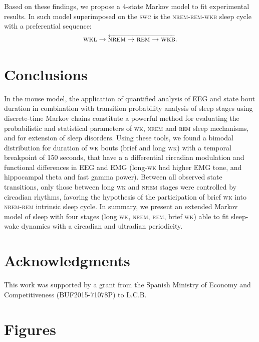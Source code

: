 \documentclass[10pt,letterpaper]{article}
\def\REM/{\textsc{rem}}
\def\NREM/{\textsc{nrem}}
\def\WK/{\textsc{wk}}
\def\WKL/{\textsc{wkl}}
\def\WKB/{\textsc{wkb}}
\def\SWC/{\textsc{swc}}
\begin{document}
 
Based on these findings, we propose a 4-state Markov model to fit  experimental results.  In such model superimposed on the \SWC/ is the \NREM/-\REM/-\WKB/ sleep cycle with a preferential sequence:
 \[ \WKL/ \rightarrow  \overleftarrow {  \NREM/\rightarrow  \REM/\rightarrow  \WKB/}   .\]


			
\section{Conclusions}
In the mouse model, the application of quantified analysis of EEG and state bout duration  in combination with transition probability analysis of sleep stages using discrete-time Markov chains constitute a powerful method for evaluating the probabilistic and statistical parameters of \WK/, \NREM/ and \REM/ sleep mechanisms, and for extension of sleep disorders. Using these tools, we found a bimodal distribution for duration of \WK/ bouts (brief and long \WK/) with a temporal breakpoint of 150 seconds, that have a  a differential circadian modulation and functional differences in EEG and EMG (long-\WK/ had higher EMG tone, and hippocampal theta and fast gamma power). Between all observed state transitions, only those between long \WK/ and \NREM/ stages were controlled by circadian rhythms, favoring the hypothesis of the participation of brief \WK/ into \NREM/-\REM/  intrinsic sleep cycle. In summary, we present an extended Markov model of sleep with four stages (long \WK/, \NREM/, \REM/, brief \WK/) able to fit sleep-wake dynamics with a circadian and ultradian periodicity.

\section{Acknowledgments}
This work was supported by a grant from the Spanish Ministry of Economy and Competitiveness (BUF2015-71078P) to L.C.B.



%


\section{Figures}
\end{document}
